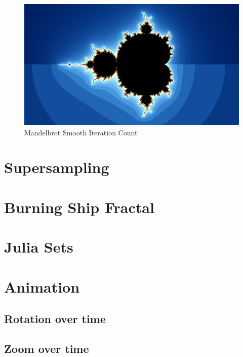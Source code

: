 \documentclass[11pt]{article}
\makeatletter
\def\maxwidth{\ifdim\Gin@nat@width>\linewidth\linewidth
    \else\Gin@nat@width\fi}
\let\Oldincludegraphics\includegraphics
\renewcommand{\includegraphics}[1]{\Oldincludegraphics[width=.8\maxwidth]{#1}}
\makeatother
\begin{document}
    \begin{figure}[h]
\centering
\includegraphics{img/smooth-iteration-count.png}
\caption{Mandelbrot Smooth Iteration Count}
\end{figure}

    \hypertarget{supersampling}{%
\section{Supersampling}\label{supersampling}}

    \hypertarget{burning-ship-fractal}{%
\section{Burning Ship Fractal}\label{burning-ship-fractal}}

    \hypertarget{julia-sets}{%
\section{Julia Sets}\label{julia-sets}}

    \hypertarget{animation}{%
\section{Animation}\label{animation}}

    \hypertarget{rotation-over-time}{%
\subsection{Rotation over time}\label{rotation-over-time}}

    \hypertarget{zoom-over-time}{%
\subsection{Zoom over time}\label{zoom-over-time}}
\end{document}
